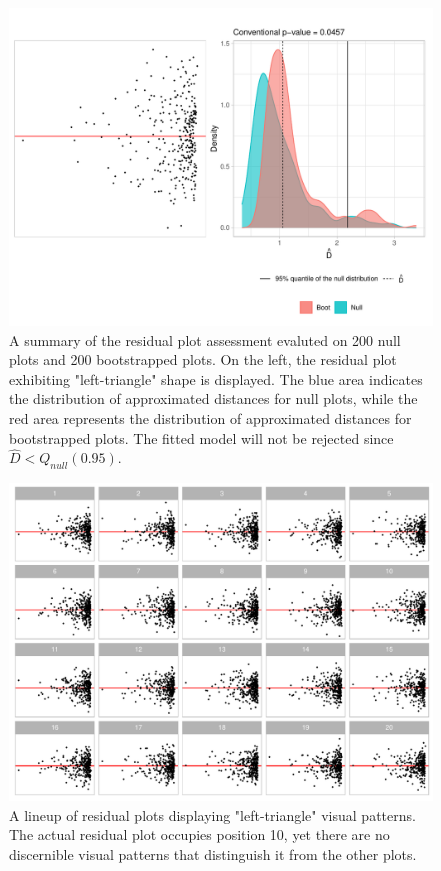 \documentclass[]{interact}
\theoremstyle{plain}%
\theoremstyle{definition}
\theoremstyle{remark}
\begin{document}
\begin{figure}[!h]

{\centering \includegraphics[width=1\linewidth]{paper_files/figure-latex/false-check-1} 

}

\caption{A summary of the residual plot assessment evaluted on 200 null plots and 200 bootstrapped plots. On the left, the residual plot exhibiting "left-triangle" shape is displayed. The blue area indicates the distribution of approximated distances for null plots, while the red area represents the distribution of approximated distances for bootstrapped plots. The fitted model will not be rejected since $\hat{D} < Q_{null}(0.95)$.}\label{fig:false-check}
\end{figure}

\begin{figure}[!h]

{\centering \includegraphics[width=1\linewidth]{paper_files/figure-latex/false-lineup-1} 

}

\caption{A lineup of residual plots displaying "left-triangle" visual patterns. The actual residual plot occupies position 10, yet there are no discernible visual patterns that distinguish it from the other plots.}\label{fig:false-lineup}
\end{figure}
\end{document}
